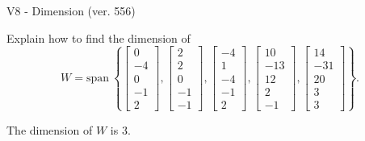 \begin{exercise}
  \begin{exerciseTitle}V8 - Dimension (ver. 556)\end{exerciseTitle}
  \begin{exerciseStatement}
    Explain how to find the dimension of 
\[W=\mathrm{span}\ \left\{\left[\begin{array}{r}
0 \\
-4 \\
0 \\
-1 \\
2
\end{array}\right] , \left[\begin{array}{r}
2 \\
2 \\
0 \\
-1 \\
-1
\end{array}\right] , \left[\begin{array}{r}
-4 \\
1 \\
-4 \\
-1 \\
2
\end{array}\right] , \left[\begin{array}{r}
10 \\
-13 \\
12 \\
2 \\
-1
\end{array}\right] , \left[\begin{array}{r}
14 \\
-31 \\
20 \\
3 \\
3
\end{array}\right]\right\}.\]



  \end{exerciseStatement}
  \begin{exerciseAnswer}
   The dimension of \(W\) is  \(3\).
  


  \end{exerciseAnswer}
\end{exercise}